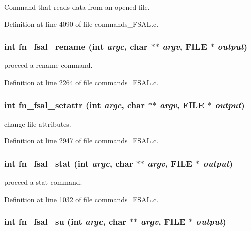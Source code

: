 Command that reads data from an opened file. 

Definition at line 4090 of file commands\_\-FSAL.c.
\subsubsection[{fn\_\-fsal\_\-rename}]{\setlength{\rightskip}{0pt plus 5cm}int fn\_\-fsal\_\-rename (int {\em argc}, \/  char $\ast$$\ast$ {\em argv}, \/  FILE $\ast$ {\em output})}\label{commands__FSAL_8c_f1fab75db40fed8f10b568eaa2e1ee83}


proceed a rename command. 

Definition at line 2264 of file commands\_\-FSAL.c.
\subsubsection[{fn\_\-fsal\_\-setattr}]{\setlength{\rightskip}{0pt plus 5cm}int fn\_\-fsal\_\-setattr (int {\em argc}, \/  char $\ast$$\ast$ {\em argv}, \/  FILE $\ast$ {\em output})}\label{commands__FSAL_8c_64ebfd92fc63b2660ade0d2986941ad0}


change file attributes. 

Definition at line 2947 of file commands\_\-FSAL.c.
\subsubsection[{fn\_\-fsal\_\-stat}]{\setlength{\rightskip}{0pt plus 5cm}int fn\_\-fsal\_\-stat (int {\em argc}, \/  char $\ast$$\ast$ {\em argv}, \/  FILE $\ast$ {\em output})}\label{commands__FSAL_8c_e507243945bd2b2378eaaa4b9ad07406}


proceed a stat command. 

Definition at line 1032 of file commands\_\-FSAL.c.
\subsubsection[{fn\_\-fsal\_\-su}]{\setlength{\rightskip}{0pt plus 5cm}int fn\_\-fsal\_\-su (int {\em argc}, \/  char $\ast$$\ast$ {\em argv}, \/  FILE $\ast$ {\em output})}\label{commands__FSAL_8c_8b60c5a24b06782c3a35897b0e4de143}


